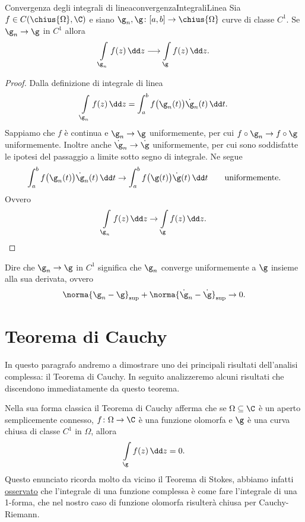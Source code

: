 \begin{prop}{Convergenza degli integrali di linea}{convergenzaIntegraliLinea}
	Sia \(f\in C(\chius{\Omega},\C)\) e siano \(\g_n,\g\colon [a,b] \to \chius{\Omega}\) curve di classe \(C^1\).
	Se \(\g_n \to \g\) in \(C^1\) allora
	\[
		\int\limits_{\g_n} f(z)\,\dd z \longrightarrow \int\limits_\g f(z)\,\dd z.
	\]
\end{prop}

\begin{proof}
	Dalla definizione di integrale di linea
	\[
		\int\limits_{\g_n} f(z)\,\dd z = \int_a^b f\big(\g_n(t)\big)\dot{\g}_n(t)\,\dd t.
	\]
	Sappiamo che \(f\) è continua e \(\g_n\to\g\) uniformemente, per cui \(f\circ \g_n \to f\circ\g\) uniformemente.
	Inoltre anche \(\dot{\g}_n \to \dot{\g}\) uniformemente, per cui sono soddisfatte le ipotesi del passaggio a limite sotto segno di integrale.
	Ne segue
	\[
		\int_a^b f\big(\g_n(t)\big)\dot{\g}_n(t)\,\dd t \to \int_a^b f\big(\g(t)\big)\dot{\g}(t)\,\dd t \qquad\text{uniformemente}.
	\]
	Ovvero
	\[
		\int\limits_{\g_n} f(z)\,\dd z \to \int\limits_\g f(z)\,\dd z.\qedhere
	\]
\end{proof}

\begin{notz}
	Dire che \(\g_n \to \g\) in \(C^1\) significa che \(\g_n\) converge uniformemente a \(\g\) insieme alla sua derivata, ovvero
	\[
		\norma{\g_n-\g}_{\sup} + \norma{\dot{\g}_n-\dot{\g}}_{\sup} \to 0.
	\]
\end{notz}
\section{Teorema di Cauchy}\label{teoremaCauchy}

In questo paragrafo andremo a dimostrare uno dei principali risultati dell'analisi complessa: il Teorema di Cauchy.
In seguito analizzeremo alcuni risultati che discendono immediatamente da questo teorema.

Nella sua forma classica il Teorema di Cauchy afferma che se \(\Omega \subseteq \C\) è un aperto semplicemente connesso, \(f\colon \Omega \to \C\) è una funzione olomorfa e \(\g\) è una curva chiusa di classe \(C^1\) in \(\Omega\), allora
\[
	\int\limits_\g f(z)\,\dd z = 0.
\]
Questo enunciato ricorda molto da vicino il Teorema di Stokes, abbiamo infatti \hyperref[similUnoForma]{osservato} che l'integrale di una funzione complessa è come fare l'integrale di una 1-forma, che nel nostro caso di funzione olomorfa risulterà chiusa per Cauchy-Riemann.

